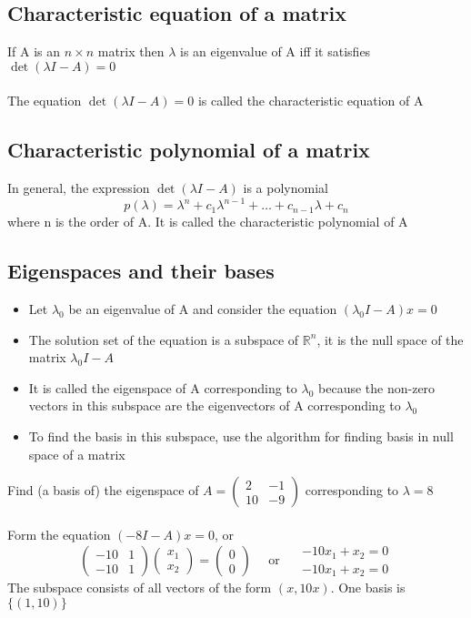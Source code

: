 \documentclass{article}[18pt]
\begin{document}
\subsection{Characteristic equation of a matrix}
If A is an $n\times n$ matrix then $\lambda$ is an eigenvalue of A iff it satisfies $\det(\lambda I-A)=0$\\
\\
The equation $\det(\lambda I-A)=0$ is called the characteristic equation of A
\subsection{Characteristic polynomial of a matrix}
In general, the expression $\det(\lambda I-A)$ is a polynomial
\[
p(\lambda)=\lambda^{n}+c_{1} \lambda^{n-1}+\ldots+c_{n-1} \lambda+c_{n}
\]
where n is the order of A. It is called the characteristic polynomial of A
\subsection{Eigenspaces and their bases}
\begin{itemize}
	\item Let $\lambda_0$ be an eigenvalue of A and consider the equation $(\lambda_0I-A)x=0$
	\item The solution set of the equation is a subspace of $\mathbb{R}^n$, it is the null space of the matrix $\lambda_0I-A$
	\item It is called the eigenspace of A corresponding to $\lambda_0$ because the non-zero vectors in this subspace are the eigenvectors of A corresponding to $\lambda_0$
	\item To find the basis in this subspace, use the algorithm for finding basis in null space of a matrix
\end{itemize}
Find (a basis of) the eigenspace of $A=\left( \begin{array}{cc}{2} & {-1} \\ {10} & {-9}\end{array}\right)$ corresponding to $\lambda=8$\\
\\
Form the equation $(-8I-A)x=0$, or
\[ 
\left( \begin{array}{cc}{-10} & {1} \\ {-10} & {1}\end{array}\right) \left( \begin{array}{c}{x_{1}} \\ {x_{2}}\end{array}\right)=\left( \begin{array}{c}{0} \\ {0}\end{array}\right) \quad \text { or } \quad \begin{array}{c}{-10 x_{1}+x_{2}=0} \\ {-10 x_{1}+x_{2}=0}\end{array}
\]
The subspace consists of all vectors of the form $(x,10x)$. One basis is $\{(1,10)\}$
\end{document}
